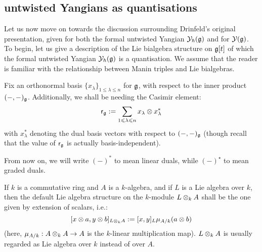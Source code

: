     \subsection{untwisted Yangians as quantisations}
        Let us now move on towards the discussion surrounding Drinfeld's original presentation, given for both the formal untwisted Yangian $\mathcal{Y}_{\hbar}(\mathfrak{g})$ and for $\mathcal{Y}(\mathfrak{g})$. To begin, let us give a description of the Lie bialgebra structure on $\mathfrak{g}[t]$ of which the formal untwisted Yangian $\mathcal{Y}_{\hbar}(\mathfrak{g})$ is a quantisation. We assume that the reader is familiar with the relationship between Manin triples and Lie bialgebras.

        \begin{convention}
            Fix an orthonormal basis $\{x_{\lambda}\}_{1 \leq \lambda \leq n}$ for $\mathfrak{g}$, with respect to the inner product $(-, -)_{\mathfrak{g}}$. Additionally, we shall be needing the Casimir element:
                $$\sfr_{\g} := \sum_{1 \leq \lambda \leq n} x_{\lambda} \tensor x_{\lambda}^*$$
            with $x_{\lambda}^*$ denoting the dual basis vectors with respect to $(-, -)_{\mathfrak{g}}$ (though recall that the value of $\mathsf{r}_{\mathfrak{g}}$ is actually basis-independent).
        \end{convention}
        \begin{convention}
            From now on, we will write $(-)^*$ to mean linear duals, while $(-)^{\star}$ to mean graded duals. 
        \end{convention}
        \begin{convention}
            If $k$ is a commutative ring and $A$ is a $k$-algebra, and if $L$ is a Lie algebra over $k$, then the default Lie algebra structure on the $k$-module $L \tensor_k A$ shall be the one given by extension of scalars, i.e.:
                $$[x \tensor a, y \tensor b]_{L \tensor_k A} := [x, y]_L \mu_{A/k}(a \tensor b)$$
            (here, $\mu_{A/k}: A \tensor_k A \to A$ is the $k$-linear multiplication map). $L \tensor_k A$ is usually regarded as Lie algebra over $k$ instead of over $A$.  
        \end{convention}
        
